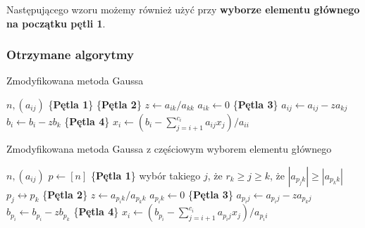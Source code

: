 \documentclass[12pt]{article}
\begin{document}
Następującego wzoru możemy również użyć przy \textbf{wyborze elementu głównego na początku pętli 1}.

\subsubsection*{Otrzymane algorytmy}

\begin{algorithm} %
\caption{Zmodyfikowana metoda Gaussa}
\label{alg3} %
\begin{algorithmic} %
    \REQUIRE $n, (a_{ij})$
    \STATE \{\textbf{Pętla 1}\}
    		\STATE \{\textbf{Pętla 2}\}
		\STATE $z \leftarrow a_{ik}/a_{kk}$
		\STATE $a_{ik} \leftarrow 0$
    			\STATE \{\textbf{Pętla 3}\}
				\STATE $a_{ij} \leftarrow a_{ij} - z a_{kj}$
    			\ENDFOR
    			\STATE $b_i \leftarrow b_i - z b_k$
    		\ENDFOR
    \ENDFOR
    \STATE \{\textbf{Pętla 4}\}
		\STATE $x_i \leftarrow (b_i - \sum^{c_i}_{j=i+1}a_{ij}x_j)/a_{ii}$
    \ENDFOR
\end{algorithmic}
\end{algorithm}


\clearpage
\begin{algorithm} %
\caption{Zmodyfikowana metoda Gaussa z częściowym wyborem elementu głównego}
\label{alg4} %
\begin{algorithmic} %
    \REQUIRE $n, (a_{ij})$
    \STATE $p \leftarrow [n]$
    \STATE \{\textbf{Pętla 1}\}
		\STATE wybór takiego $j$, że $r_k \geq j \geq k$, że $|a_{p_jk}| \geq |a_{p_kk}|$
		\STATE $p_j \leftrightarrow p_k$
    		\STATE \{\textbf{Pętla 2}\}
		\STATE $z \leftarrow a_{p_ik}/a_{p_kk}$
		\STATE $a_{p_ik} \leftarrow 0$
    			\STATE \{\textbf{Pętla 3}\}
				\STATE $a_{p_ij} \leftarrow a_{p_ij} - z a_{p_kj}$
    			\ENDFOR
    			\STATE $b_{p_i} \leftarrow b_{p_i} - z b_{p_k}$
    		\ENDFOR
    \ENDFOR
    \STATE \{\textbf{Pętla 4}\}
		\STATE $x_i \leftarrow (b_{p_i} - \sum^{c_i}_{j=i+1}a_{p_ij}x_j)/a_{p_ii}$
    \ENDFOR
\end{algorithmic}
\end{algorithm}
\end{document}

